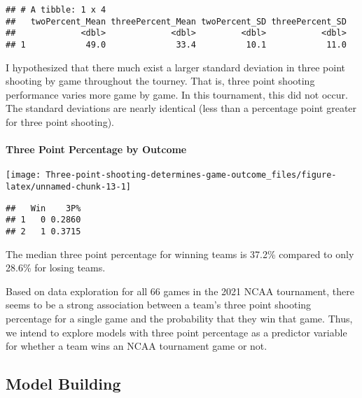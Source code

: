 \documentclass[
]{article}
\begin{document}
\begin{verbatim}
## # A tibble: 1 x 4
##   twoPercent_Mean threePercent_Mean twoPercent_SD threePercent_SD
##             <dbl>             <dbl>         <dbl>           <dbl>
## 1            49.0              33.4          10.1            11.0
\end{verbatim}

I hypothesized that there much exist a larger standard deviation in
three point shooting by game throughout the tourney. That is, three
point shooting performance varies more game by game. In this tournament,
this did not occur. The standard deviations are nearly identical (less
than a percentage point greater for three point shooting).

\hypertarget{three-point-percentage-by-outcome}{%
\paragraph{Three Point Percentage by
Outcome}\label{three-point-percentage-by-outcome}}

\begin{center}\texttt{[image: Three-point-shooting-determines-game-outcome\_files/figure-latex/unnamed-chunk-13-1]} \end{center}

\begin{verbatim}
##   Win    3P%
## 1   0 0.2860
## 2   1 0.3715
\end{verbatim}

The median three point percentage for winning teams is 37.2\% compared
to only 28.6\% for losing teams.

Based on data exploration for all 66 games in the 2021 NCAA tournament,
there seems to be a strong association between a team's three point
shooting percentage for a single game and the probability that they win
that game. Thus, we intend to explore models with three point percentage
as a predictor variable for whether a team wins an NCAA tournament game
or not.

\hypertarget{model-building}{%
\subsection{Model Building}\label{model-building}}
\end{document}
